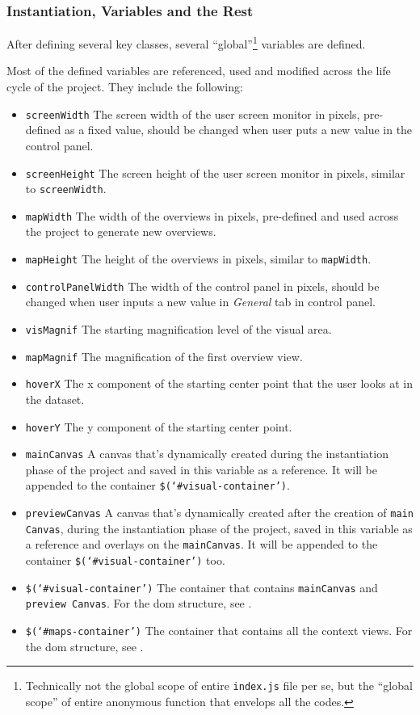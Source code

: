 \subsubsection{Instantiation, Variables and the Rest}

After defining several key classes, several ``global''\footnote{ Technically not the global scope of entire \texttt{index.js} file per se, but the ``global scope'' of entire anonymous function that envelops all the codes.} variables are defined.

Most of the defined variables are referenced, used and modified across the life cycle of the project. They include the following:

\begin{itemize}
  \item \texttt{screenWidth} The screen width of the user screen monitor in pixels, pre-defined as a fixed value, should be changed when user puts a new value in the control panel.
  \item \texttt{screenHeight} The screen height of the user screen monitor in pixels, similar to \texttt{screenWidth}.
  \item \texttt{mapWidth} The width of the overviews in pixels, pre-defined and used across the project to generate new overviews.
  \item \texttt{mapHeight} The height of the overviews in pixels, similar to \texttt{mapWidth}.
  \item \texttt{controlPanelWidth} The width of the control panel in pixels, should be changed when user inputs a new value in \emph{General} tab in control panel.
  \item \texttt{visMagnif} The starting magnification level of the visual area.
  \item \texttt{mapMagnif} The magnification of the first overview view.
  \item \texttt{hoverX} The x component of the starting center point that the user looks at in the dataset.
  \item \texttt{hoverY} The y component of the starting center point.
  \item \texttt{mainCanvas} A canvas that's dynamically created during the instantiation phase of the project and saved in this variable as a reference. It will be appended to the container \texttt{\$(`\#visual-container')}.
  \item \texttt{previewCanvas} A canvas that's dynamically created after the creation of \texttt{main Canvas}, during the instantiation phase of the project, saved in this variable as a reference and overlays on the \texttt{mainCanvas}. It will be appended to the container \texttt{\$(`\#visual-container')} too.
  \item \texttt{\$(`\#visual-container')} The container that contains \texttt{mainCanvas} and \texttt{preview Canvas}. For the \gls{dom} structure, see .
  \item \texttt{\$(`\#maps-container')} The container that contains all the context views. For the \gls{dom} structure, see .
\end{itemize}

